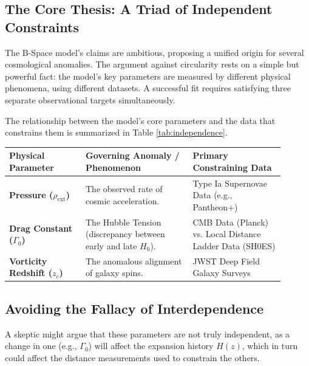 \documentclass{BSpacePaper} %
\begin{document}
\begin{appendices}
\subsection{The Core Thesis: A Triad of Independent Constraints}
The B-Space model's claims are ambitious, proposing a unified origin for several cosmological anomalies. The argument against circularity rests on a simple but powerful fact: the model's key parameters are measured by different physical phenomena, using different datasets. A successful fit requires satisfying three separate observational targets simultaneously.

The relationship between the model's core parameters and the data that constrains them is summarized in Table \ref{tab:independence}.

\begin{center}
    \captionsetup{type=table}
    \label{tab:independence}
    \begin{tabular}{@{}>{\raggedright}p{0.25\linewidth} >{\raggedright}p{0.35\linewidth} >{\raggedright\arraybackslash}p{0.3\linewidth}@{}}
    \toprule
    \textbf{Physical Parameter} & \textbf{Governing Anomaly / Phenomenon} & \textbf{Primary Constraining Data} \\
    \midrule
    \textbf{Pressure ($\rho_{\text{ext}}$)} & The observed rate of cosmic acceleration. & Type Ia Supernovae Data (e.g., Pantheon+) \\
    \addlinespace
    \textbf{Drag Constant ($\Gamma_0$)} & The Hubble Tension (discrepancy between early and late $H_0$). & CMB Data (Planck) vs. Local Distance Ladder Data (SH0ES) \\
    \addlinespace
    \textbf{Vorticity Redshift ($z_c$)} & The anomalous alignment of galaxy spins. & JWST Deep Field Galaxy Surveys \\
    \bottomrule
    \end{tabular}
\end{center}

\subsection{Avoiding the Fallacy of Interdependence}
A skeptic might argue that these parameters are not truly independent, as a change in one (e.g., $\Gamma_0$) will affect the expansion history $H(z)$, which in turn could affect the distance measurements used to constrain the others.


\end{appendices}
\end{document}
